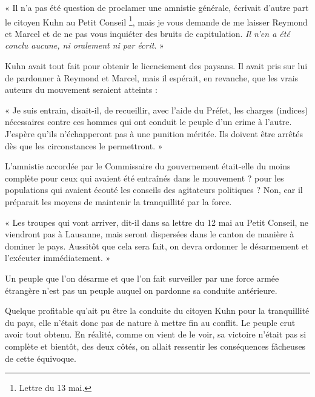 \documentclass[french,twoside]{book} %
\newenvironment{quoteblock}%
  {\begin{quoting}}
  {\end{quoting}}
\newenvironment{quotebar}{%
    \def\FrameCommand{{\color{rubric!10!}\vrule width 0.5em} \hspace{0.9em}}%
    \def\OuterFrameSep{\itemsep} %
    \MakeFramed {\advance\hsize-\width \FrameRestore}
  }%
  {%
    \endMakeFramed
  }
\renewenvironment{quoteblock}%
  {%
    \savenotes
    \setstretch{0.9}
    \begin{quotebar}
  }
  {%
    \end{quotebar}
    \spewnotes
  }
\begin{document}
\begin{quoteblock}
 \noindent « Il n’a pas été question de proclamer une amnistie générale, écrivait d’autre part le citoyen Kuhn au Petit Conseil \footnote{Lettre du 13 mai.}, mais je vous demande de me laisser Reymond et Marcel et de ne pas vous inquiéter des bruits de capitulation. \emph{Il n’en a été conclu aucune, ni oralement ni par écrit}. »
 \end{quoteblock}

\noindent Kuhn avait tout fait pour obtenir le licenciement des paysans. Il avait pris sur lui de pardonner à Reymond et Marcel, mais il espérait, en revanche, que les vrais auteurs du mouvement seraient atteints :\par

\begin{quoteblock}
 \noindent « Je suis entrain, disait-il, de recueillir, avec l’aide du Préfet, les charges (indices) nécessaires contre ces hommes qui ont conduit le peuple d’un crime à l’autre. J’espère qu’ils n’échapperont pas à une punition méritée. Ils doivent être arrêtés dès que les circonstances le permettront. »
 \end{quoteblock}

\noindent L’amnistie accordée par le Commissaire du gouvernement était-elle du moins complète pour ceux qui avaient été entraînés dans le mouvement ? pour les populations qui avaient écouté les conseils des agitateurs politiques ? Non, car il préparait les moyens de maintenir la tranquillité par la force.\par

\begin{quoteblock}
 \noindent « Les troupes qui vont arriver, dit-il dans sa lettre du 12 mai au Petit Conseil, ne viendront pas à Lausanne, mais seront dispersées dans le canton de manière à dominer le pays. Aussitôt que cela sera fait, on devra ordonner le désarmement et l’exécuter immédiatement. »
 \end{quoteblock}

\noindent Un peuple que l’on désarme et que l’on fait surveiller par une force armée étrangère n’est pas un peuple auquel on pardonne sa conduite antérieure.\par
Quelque profitable qu’ait pu être la conduite du citoyen Kuhn pour la tranquillité du pays, elle n’était donc pas de nature à mettre fin au conflit. Le peuple crut avoir tout obtenu. En réalité, comme on vient de le voir, sa victoire n’était pas si complète et bientôt, des deux côtés, on allait ressentir les conséquences fâcheuses de cette équivoque.
\end{document}
